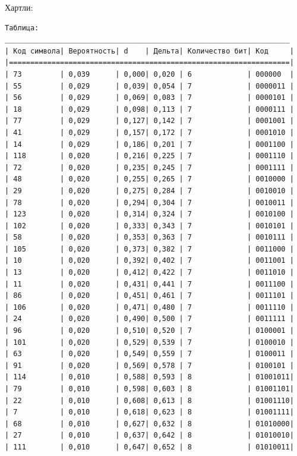 \documentclass[a4paper,14pt]{extarticle}
\begin{document}
\begin{enumerate}
Хартли:\\
\begin{verbatim}
Таблица: 
___________________________________________________________________
| Код символа| Вероятность| d    | Дельта| Количество бит| Код     |
|==================================================================|
| 73         | 0,039      | 0,000| 0,020 | 6             | 000000  |
| 55         | 0,029      | 0,039| 0,054 | 7             | 0000011 |
| 56         | 0,029      | 0,069| 0,083 | 7             | 0000101 |
| 18         | 0,029      | 0,098| 0,113 | 7             | 0000111 |
| 77         | 0,029      | 0,127| 0,142 | 7             | 0001001 |
| 41         | 0,029      | 0,157| 0,172 | 7             | 0001010 |
| 14         | 0,029      | 0,186| 0,201 | 7             | 0001100 |
| 118        | 0,020      | 0,216| 0,225 | 7             | 0001110 |
| 72         | 0,020      | 0,235| 0,245 | 7             | 0001111 |
| 48         | 0,020      | 0,255| 0,265 | 7             | 0010000 |
| 29         | 0,020      | 0,275| 0,284 | 7             | 0010010 |
| 78         | 0,020      | 0,294| 0,304 | 7             | 0010011 |
| 123        | 0,020      | 0,314| 0,324 | 7             | 0010100 |
| 102        | 0,020      | 0,333| 0,343 | 7             | 0010101 |
| 58         | 0,020      | 0,353| 0,363 | 7             | 0010111 |
| 105        | 0,020      | 0,373| 0,382 | 7             | 0011000 |
| 10         | 0,020      | 0,392| 0,402 | 7             | 0011001 |
| 13         | 0,020      | 0,412| 0,422 | 7             | 0011010 |
| 11         | 0,020      | 0,431| 0,441 | 7             | 0011100 |
| 86         | 0,020      | 0,451| 0,461 | 7             | 0011101 |
| 106        | 0,020      | 0,471| 0,480 | 7             | 0011110 |
| 24         | 0,020      | 0,490| 0,500 | 7             | 0011111 |
| 96         | 0,020      | 0,510| 0,520 | 7             | 0100001 |
| 101        | 0,020      | 0,529| 0,539 | 7             | 0100010 |
| 63         | 0,020      | 0,549| 0,559 | 7             | 0100011 |
| 91         | 0,020      | 0,569| 0,578 | 7             | 0100101 |
| 114        | 0,010      | 0,588| 0,593 | 8             | 01001011|
| 79         | 0,010      | 0,598| 0,603 | 8             | 01001101|
| 22         | 0,010      | 0,608| 0,613 | 8             | 01001110|
| 7          | 0,010      | 0,618| 0,623 | 8             | 01001111|
| 68         | 0,010      | 0,627| 0,632 | 8             | 01010000|
| 27         | 0,010      | 0,637| 0,642 | 8             | 01010010|
| 111        | 0,010      | 0,647| 0,652 | 8             | 01010011|

\end{verbatim}
\end{enumerate}
\end{document}
